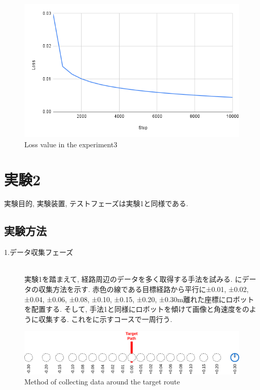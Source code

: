 \begin{figure}[h]
  \centering
  \includegraphics[keepaspectratio, scale=0.31]{images/exp1.2_10000.png}
  \caption{Loss value in the experiment3}
  \label{Fig:exp1.2_10000}
  \end{figure}

\newpage
\section{実験2}
実験目的, 実験装置, テストフェーズは実験1と同様である.
\subsection{実験方法}
\begin{description}
  \item[1.データ収集フェーズ]\mbox{}\\実験1を踏まえて, 経路周辺のデータを多く取得する手法を試みる. にデータの収集方法を示す. 赤色の線である目標経路から平行に±0.01, ±0.02, ±0.04, ±0.06, ±0.08, ±0.10, ±0.15, ±0.20, ±0.30m離れた座標にロボットを配置する. そして, 手法1と同様にロボットを傾けて画像と角速度をのように収集する. これをに示すコースで一周行う.  
\end{description}

\begin{figure}[h]
  \centering
  \includegraphics[keepaspectratio, scale=0.18]{images/collect-data.png}
  \caption{Method of collecting data around the target route}
  \label{Fig:collect-data}
  \end{figure}


